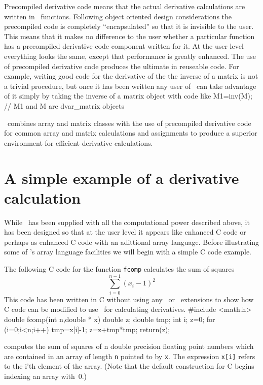 \documentclass[12pt]{book}
\begin{document}
Precompiled derivative code means that the actual derivative 
calculations are written in \cplus\ functions. Following 
object oriented design considerations the precompiled code is
completely ``encapsulated'' so that it is invisible to
the user. This means that it makes no difference to the user
whether a particular function has a precompiled derivative
code component written for it. At the user level everything looks the
same, except that performance is greatly enhanced.
The use of precompiled derivative code produces the ultimate in reuseable
code. For example, writing good code for the derivative of the 
the inverse of a matrix is not a trivial procedure, but once
it has been written any user of \AD\ can take advantage of it simply 
by taking the inverse of a matrix object with code like
\beginexample
M1=inv(M);  // M1 and M are dvar_matrix objects
\endexample

\AD\ combines array and matrix classes with the use of precompiled
derivative code for common array and matrix calculations and assignments
to produce a superior environment for efficient derivative calculations.

\section{A simple example of a derivative calculation}

While \AD\ has been supplied with all the computational power
described above, it has been designed so that at the user level
it appears like enhanced C code or perhaps as enhanced C code with
an adittional array language.  Before illustrating some of \AD's
array language facilities we will begin with a simple
C code example.

The following C code for the function {\tt fcomp}
calculates the sum of squares
$$\sum_{i=0}^{n-1} (x_i-1)^2 $$
This code has been written in C without using any \cplus\ or \AD\
extensions to show how C code can be modified to use \AD\ for calculating
derivatives.
\bigbreak
\beginexample
#include <math.h>
double fcomp(int n,double * x)
{
  double z;
  double tmp;
  int i;
  z=0;
  for (i=0;i<n;i++)
  {
    tmp=x[i]-1;
    z=z+tmp*tmp;
  }
  return(z);
}
\endexample
\bigbreak

 computes the sum of squares of n double precision floating
point numbers which are contained in an array of length {\tt n} pointed
to by {\tt x}. The expression {\tt x[i]} refers to the i'th
element of the array. (Note that the default construction for
C begins indexing an array with~0.) 
\end{document}
